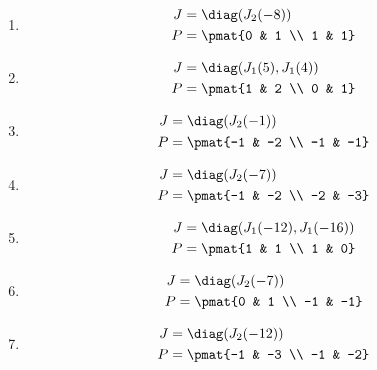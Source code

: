 \begin{enumerate}
\item

\begin{align*}
J &= \diag(J_{2}(-8))\\
P &= \pmat{0 & 1 \\ 1 & 1}
\end{align*}

\item

\begin{align*}
J &= \diag(J_{1}(5), J_{1}(4))\\
P &= \pmat{1 & 2 \\ 0 & 1}
\end{align*}

\item

\begin{align*}
J &= \diag(J_{2}(-1))\\
P &= \pmat{-1 & -2 \\ -1 & -1}
\end{align*}

\item

\begin{align*}
J &= \diag(J_{2}(-7))\\
P &= \pmat{-1 & -2 \\ -2 & -3}
\end{align*}

\item

\begin{align*}
J &= \diag(J_{1}(-12), J_{1}(-16))\\
P &= \pmat{1 & 1 \\ 1 & 0}
\end{align*}

\item

\begin{align*}
J &= \diag(J_{2}(-7))\\
P &= \pmat{0 & 1 \\ -1 & -1}
\end{align*}

\item

\begin{align*}
J &= \diag(J_{2}(-12))\\
P &= \pmat{-1 & -3 \\ -1 & -2}
\end{align*}


\end{enumerate}
